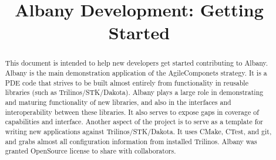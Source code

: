 \documentclass[pdf,12pt,report,strict]{SANDreport}
\title{Albany Development: Getting Started}
\date{}               %
\theoremstyle{remark}
\begin{document}
\maketitle

%
\begin{abstract}
This document is intended to help new developers get started
contributing to Albany. Albany is the main demonstration application
of the AgileComponets strategy. It is a PDE code that strives to be
built almost entirely from functionality in reusable libraries (such
as Trilinos/STK/Dakota). Albany plays a large role in demonstrating
and maturing functionality of new libraries, and also in the
interfaces and interoperability between these libraries. It also
serves to expose gaps in coverage of capabilities and
interface. Another aspect of the project is to serve as a template for
writing new applications against Trilinos/STK/Dakota. It uses CMake,
CTest, and git, and grabs almost all configuration information from
installed Trilinos. Albany was granted OpenSource license to share
with collaborators.
\end{abstract}


%

%
\cleardoublepage            %
\tableofcontents
\listoffigures
\listoftables


%
%
\end{document}
